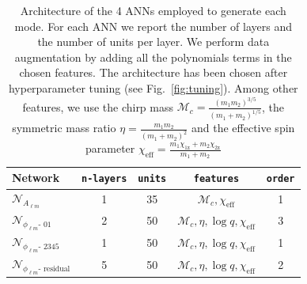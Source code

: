 \documentclass[twocolumn,showpacs,preprintnumbers,nofootinbib,prd,
superscriptaddress,10pt]{revtex4-2}
\begin{document}
\begin{table}[t]
	\begin{tabular}{ l|c|c|c|c } 
		Network & \texttt{n-layers} & \texttt{units} & \texttt{features} & \texttt{order} \\
		\hline\hline
			$\mathcal{N}_{A_{\ell m}}$
				& 1 & 35 & $\mathcal{M}_c, \chi_\text{eff}$ & 1 \\
			$\mathcal{N}_{\phi_{\ell m}\text{- 01}}$ 
				& 2 & 50 & $\mathcal{M}_c, \eta, \log q, \chi_\text{eff}$ & 3 \\
			$\mathcal{N}_{\phi_{\ell m}\text{- 2345}}$
				& 1 & 50 & $\mathcal{M}_c, \eta, \log q, \chi_\text{eff}$ & 1 \\
			$\mathcal{N}_{\phi_{\ell m}\text{- residual}}$
				& 5 & 50 & $\mathcal{M}_c, \eta, \log q, \chi_\text{eff}$ & 2 \\
	\end{tabular}
	\label{tab:model}
	\caption{Architecture of the 4 ANNs employed to generate each mode. For each ANN we report the number of layers and the number of units per layer. 
	We perform data augmentation by adding all the polynomials terms in the chosen features.
	The architecture has been chosen after hyperparameter tuning (see Fig.~\ref{fig:tuning}).
	Among other features, we use the chirp mass $\mathcal{M}_c =\frac{(m_1 m_2)^{3/5}}{(m_1+m_2)^{1/5}}$, the symmetric mass ratio $\eta = \frac{m_1 m_2}{(m_1+m_2)^2}$ and the effective spin parameter $\chi_\text{eff} = \frac{m_1 \chi_\text{1z} +m_2 \chi_\text{2z}}{m_1+m_2}$
	}
\end{table}
\end{document}
